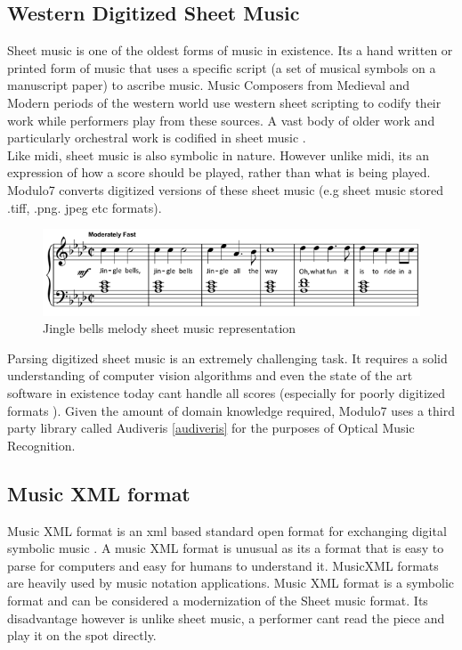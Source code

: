 \subsection{Western Digitized Sheet Music} \label{digitizedsheet}
\noindent Sheet music is one of the oldest forms of music in existence. Its a hand written or printed form of music that uses a specific script (a set of musical symbols on a manuscript paper) to ascribe music. Music Composers from Medieval and Modern periods of the western world use western sheet scripting to codify their work while performers play from these sources. A vast body of older work and particularly orchestral work is codified in sheet music \cite{theorytreatise}. \\

\noindent Like midi, sheet music is also symbolic in nature. However unlike midi, its an expression of how a score should be played, rather than what is being played. Modulo7 converts digitized versions of these sheet music (e.g sheet music stored .tiff, .png. jpeg etc formats). \\

\begin{figure}
\centering
\includegraphics[width=\textwidth]{jingle-bells-sheet-music-piano.png}
\makeatletter
\let\@currsize\normalsize
\caption{Jingle bells melody sheet music representation}
\label{fig:sheetmusicexample}
\end{figure}

\noindent Parsing digitized sheet music is an extremely challenging task. It requires a solid understanding of computer vision algorithms and even the state of the art software in existence today cant handle all scores (especially for poorly digitized formats \cite{gamera}). Given the amount of domain knowledge required, Modulo7 uses a third party library called Audiveris \ref{audiveris} for the purposes of Optical Music Recognition. 

\subsection{Music XML format}
\noindent Music XML format is an xml based standard open format for exchanging digital symbolic music \cite{musicxmlspecification}. A music XML format is unusual as its a format that is easy to parse for computers and easy for humans to understand it. MusicXML formats are heavily used by music notation applications. Music XML format is a symbolic format and can be considered a modernization of the Sheet music format. Its disadvantage however is unlike sheet music, a performer cant read the piece and play it on the spot directly. \\

